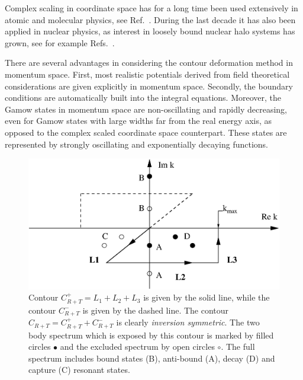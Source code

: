 Complex scaling in coordinate space has for a long time been used
extensively in atomic and molecular physics, see
Ref.~\cite{nimrod}. During the last decade it has also been applied
in nuclear physics, as interest in loosely bound nuclear halo
systems has grown, see for example Refs.~\cite{csoto}.

There are several advantages in considering the contour
deformation method in momentum space. First, most realistic
potentials derived from field theoretical considerations are given
explicitly in momentum space. Secondly, the boundary conditions
are automatically built into the integral equations. Moreover, the
Gamow states in momentum space are non-oscillating and rapidly
decreasing, even for Gamow states with large widths far from the
real energy axis, as opposed to the complex scaled coordinate
space counterpart. These states are represented by strongly
oscillating and exponentially decaying functions.

\begin{figure}[hbtp]
\begin{center}
\includegraphics[scale=0.4]{figures/gen_cont.eps}
\end{center}
\caption{Contour $ C_{R+T}^{+} = L_{1} + L_{2} + L_{3} $ is given
by the solid line, while the contour $C_{R+T}^{-} $ is given by
the dashed line. The contour $C_{R+T} = C_{R+T}^{+}+C_{R+T}^{-}$
is clearly \emph{inversion symmetric}. The two body spectrum which
is exposed by this contour is marked by filled circles $ \bullet $
and the excluded spectrum by open circles $\circ $. The full
spectrum includes bound states (B), anti-bound (A), decay (D) and
capture (C) resonant states.  } \label{fig:contour2}
\end{figure}

